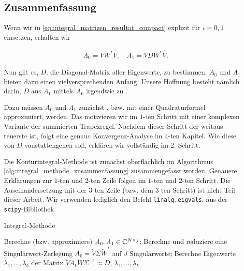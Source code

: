\subsection*{Zusammenfassung}

Wenn wir in \eqref{eq:integral_matrizen_resultat_compact} explizit für $i = 0, 1$ einsetzen, erhalten wir

\begin{align} \label{eq:integral_matrizen_resultat}
    A_0 = V W^\ast \hat V,
    \quad
    A_1 = V D W^\ast \hat V.
\end{align}

Nun gilt es, $D$, die Diagonal-Matrix aller Eigenwerte, zu bestimmen.
$A_0$ und $A_1$ bieten dazu einen vielversprechenden Anfang.
Unsere Hoffnung besteht nämlich darin, $D$ aus $A_1$ mittels $A_0$ irgendwie zu .

Dazu müssen $A_0$ und $A_1$ zunächst , bzw. mit einer Quadraturformel approximiert, werden.
Das motivieren wir im $1$-ten Schritt mit einer komplexen Variante der summierten Trapezregel.
Nachdem dieser Schritt der weitaus teuerste ist, folgt eine genaue Konvergenz-Analyse im $4$-ten Kapitel.
Wie diese  von $D$ vonstattengehen soll, erklären wir vollständig im 2. Schritt.

Die Konturintegral-Methode ist zunächst oberflächlich im Algorithmus \ref{alg:integral_methode_zusammenfassung} zusammengefasst worden.
Genauere Erklärungen zur $1$-ten und $2$-ten Zeile folgen im $1$-ten und $2$-ten Schritt.
Die Auseinandersetzung mit der $3$-ten Zeile (bzw. dem $3$-ten Schritt) ist nicht Teil dieser Arbeit.
Wir verwenden lediglich den Befehl \texttt{linalg.eigvals}, aus der \texttt{scipy}-Bibliothek.

\begin{algorithm}[H]
	\caption{Integral-Methode}
    \begin{algorithmic}[0]
            \State Berechne (bzw. approximiere) $A_0, A_1 \in \mathbb{C}^{N \times j}$;
            \State Berechne und reduziere eine Singulärwert-Zerlegung $A_0 = \tilde V \Sigma \tilde W^\ast$ auf $J$ Singulärwerte;
            \State Berechne Eigenwerte $\lambda_1, \dots, \lambda_k$ der Matrix $\tilde V A_1 \tilde W \Sigma^{-1} \approx D$;
            \State \Return $\lambda_1, \dots, \lambda_k$
		\EndProcedure
    \end{algorithmic}
    \caption{}
    \label{alg:integral_methode_zusammenfassung}
\end{algorithm}

